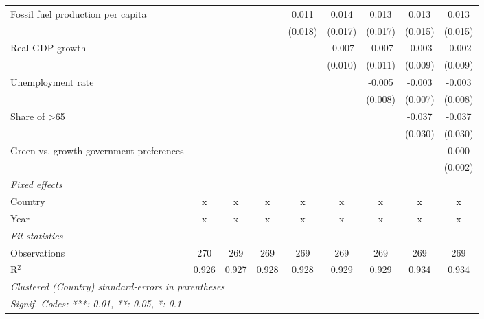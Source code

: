 \begin{table}[htbp]
\begin{tabular}{lcccccccc}
      Fossil fuel production per capita               &                &                &         & 0.011   & 0.014   & 0.013   & 0.013   & 0.013\\   
                                                      &                &                &         & (0.018) & (0.017) & (0.017) & (0.015) & (0.015)\\   
      Real GDP growth                                 &                &                &         &         & -0.007  & -0.007  & -0.003  & -0.002\\   
                                                      &                &                &         &         & (0.010) & (0.011) & (0.009) & (0.009)\\   
      Unemployment rate                               &                &                &         &         &         & -0.005  & -0.003  & -0.003\\   
                                                      &                &                &         &         &         & (0.008) & (0.007) & (0.008)\\   
      Share of >65                                    &                &                &         &         &         &         & -0.037  & -0.037\\   
                                                      &                &                &         &         &         &         & (0.030) & (0.030)\\   
      Green vs. growth government preferences         &                &                &         &         &         &         &         & 0.000\\   
                                                      &                &                &         &         &         &         &         & (0.002)\\   
      \emph{Fixed effects}\\
      Country                                         & x              & x              & x       & x       & x       & x       & x       & x\\  
      Year                                            & x              & x              & x       & x       & x       & x       & x       & x\\  
      \midrule \emph{Fit statistics}\\
      Observations                                    & 270            & 269            & 269     & 269     & 269     & 269     & 269     & 269\\  
      R$^2$                                           & 0.926          & 0.927          & 0.928   & 0.928   & 0.929   & 0.929   & 0.934   & 0.934\\  
      \midrule
      \multicolumn{9}{l}{\emph{Clustered (Country) standard-errors in parentheses}}\\
      \multicolumn{9}{l}{\emph{Signif. Codes: ***: 0.01, **: 0.05, *: 0.1}}\\
   \end{tabular}
\end{table}


